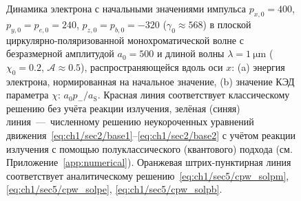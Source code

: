 \begin{comment}
    Однако найденное нами решение становится всё более точным с ростом $\varphi$, что продемонстрировано на Рис.~\ref{fig:ch1/sec5/cpw}.
    
    Таким образом итоговое решение уравнений движения электрона в циркулярно-поляризованной монохроматической плоской волне с начальными условиями $p(0) = a_0$, $\psi_0 = \pi/2$ имеют следующий вид
    \begin{gather}
        \label{eq:ch1/sec5/cpw_solpm}
        p_- = \frac{p_{-,0}}{1 + \mathcal{A}\varphi}, \\
        \label{eq:ch1/sec5/cpw_solp}
        p = a_0 \left(1 - \frac{\mathcal{A}\sin\varphi}{1 + \mathcal{A}\varphi}\right), \\
        \label{eq:ch1/sec5/cpw_solpsi}
        \psi = -\frac{\pi}{2} - \frac{\mathcal{A}(1 - \cos\varphi)}{1 + \mathcal{A}\varphi}, \\
        \label{eq:ch1/sec5/cpw_solg}
        \gamma = \frac{1}{2} \left( \frac{(1+p^2)\left( 1 + \mathcal{A}\varphi \right)}{p_{-,0}} + \frac{p_{-,0}}{1 + \mathcal{A}\varphi} \right).
    \end{gather}
    Решение с произвольными начальными условиями может быть получено с помощью соответствующего преобразования Лоренца, которое не приводится в силу громоздкости.
\end{comment}
\begin{figure}[ht]
    \caption[Динамика электрона в циркулярно-поляризованной монохроматической плоской волне]{
    Динамика электрона с начальными значениями импульса $p_{x, 0} = 400$, $p_{y, 0} = p_{e, 0} = 240$, $p_{z, 0} = p_{b,0} = -320$ ($\gamma_0 \approx 568$) в плоской циркулярно-поляризованной монохроматической волне с безразмерной амплитудой $a_0 = 500$ и длиной волны $\lambda = \SI{1}{\um}$ ($\chi_0 = 0.2$, $\mathcal{A}\approx 0.5$), распространяющейся вдоль оси $x$: (a) энергия электрона, нормированная на начальное значение, (b) значение КЭД параметра $\chi$: $a_0 p_-/a_\mathrm{S}$. Красная линия соответствует классическому решению без учёта реакции излучения, зелёная (синяя) линия~---~численному решению неукороченных уравнений движения~\eqref{eq:ch1/sec2/base1}--\eqref{eq:ch1/sec2/base2} с учётом реакции излучения с помощью полуклассического (квантового) подхода (см. Приложение~\ref{app:numerical}). Оранжевая штрих-пунктирная линия соответствует аналитическому решению~\eqref{eq:ch1/sec5/cpw_solpm}, \eqref{eq:ch1/sec5/cpw_solpe}, \eqref{eq:ch1/sec5/cpw_solpb}.}
    \label{fig:ch1/sec5/cpw}
\end{figure}

